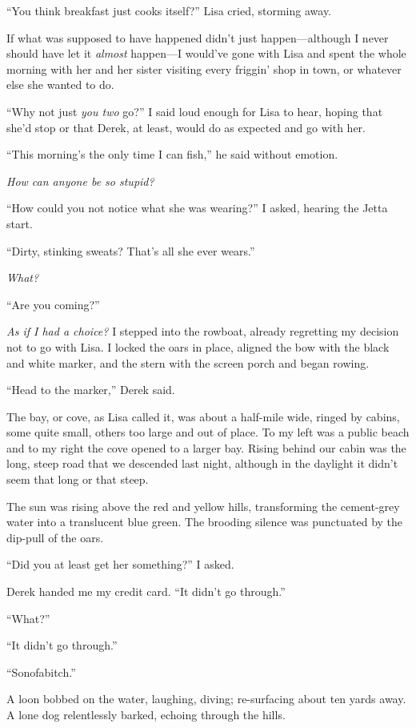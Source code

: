 ``You think breakfast just cooks itself?'' Lisa cried, storming away.

If what was supposed to have happened didn't just happen---although I
never should have let it \emph{almost} happen---I would've gone with
Lisa and spent the whole morning with her and her sister visiting every
friggin' shop in town, or whatever else she wanted to do.

``Why not just \emph{you two} go?'' I said loud enough for Lisa to hear,
hoping that she'd stop or that Derek, at least, would do as expected and
go with her.

``This morning's the only time I can fish,'' he said without emotion.

\emph{How can anyone be so stupid?}

``How could you not notice what she was wearing?'' I asked, hearing the
Jetta start.

``Dirty, stinking sweats? That's all she ever wears.''

\emph{What?}

``Are you coming?''

\emph{As if I had a choice?} I stepped into the rowboat, already
regretting my decision not to go with Lisa. I locked the oars in place,
aligned the bow with the black and white marker, and the stern with the
screen porch and began rowing.

``Head to the marker,'' Derek said.

The bay, or cove, as Lisa called it, was about a half-mile wide, ringed
by cabins, some quite small, others too large and out of place. To my
left was a public beach and to my right the cove opened to a larger bay.
Rising behind our cabin was the long, steep road that we descended last
night, although in the daylight it didn't seem that long or that steep.

The sun was rising above the red and yellow hills, transforming the
cement-grey water into a translucent blue green. The brooding silence
was punctuated by the dip-pull of the oars.

``Did you at least get her something?'' I asked.

Derek handed me my credit card. ``It didn't go through.''

``What?''

``It didn't go through.''

``Sonofabitch.''

A loon bobbed on the water, laughing, diving; re-surfacing about ten
yards away. A lone dog relentlessly barked, echoing through the hills.

